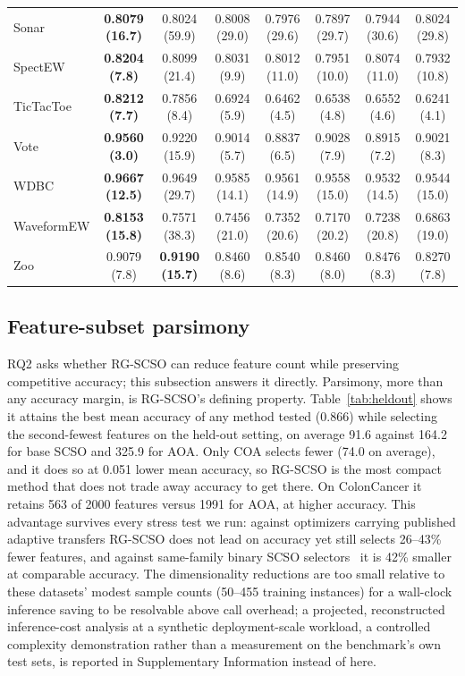 \documentclass[iicol,sn-basic,pdflatex]{sn-jnl}
\begin{document}
\begin{table}[t]
\begin{tabular}{lccccccc}
Sonar & \textbf{0.8079 (16.7)} & 0.8024 (59.9) & 0.8008 (29.0) & 0.7976 (29.6) & 0.7897 (29.7) & 0.7944 (30.6) & 0.8024 (29.8) \\
SpectEW & \textbf{0.8204 (7.8)} & 0.8099 (21.4) & 0.8031 (9.9) & 0.8012 (11.0) & 0.7951 (10.0) & 0.8074 (11.0) & 0.7932 (10.8) \\
TicTacToe & \textbf{0.8212 (7.7)} & 0.7856 (8.4) & 0.6924 (5.9) & 0.6462 (4.5) & 0.6538 (4.8) & 0.6552 (4.6) & 0.6241 (4.1) \\
Vote & \textbf{0.9560 (3.0)} & 0.9220 (15.9) & 0.9014 (5.7) & 0.8837 (6.5) & 0.9028 (7.9) & 0.8915 (7.2) & 0.9021 (8.3) \\
WDBC & \textbf{0.9667 (12.5)} & 0.9649 (29.7) & 0.9585 (14.1) & 0.9561 (14.9) & 0.9558 (15.0) & 0.9532 (14.5) & 0.9544 (15.0) \\
WaveformEW & \textbf{0.8153 (15.8)} & 0.7571 (38.3) & 0.7456 (21.0) & 0.7352 (20.6) & 0.7170 (20.2) & 0.7238 (20.8) & 0.6863 (19.0) \\
Zoo & 0.9079 (7.8) & \textbf{0.9190 (15.7)} & 0.8460 (8.6) & 0.8540 (8.3) & 0.8460 (8.0) & 0.8476 (8.3) & 0.8270 (7.8) \\
\bottomrule
\end{tabular}
\end{table}


\subsection{Feature-subset parsimony}
\label{sec:parsimony}
RQ2 asks whether RG-SCSO can reduce feature count while preserving
competitive accuracy; this subsection answers it directly. Parsimony, more
than any accuracy margin, is RG-SCSO's defining property.
Table~\ref{tab:heldout} shows it attains the best mean accuracy of any
method tested (0.866) while selecting the
second-fewest features on the held-out setting, on average
91.6 against
164.2 for base SCSO and
325.9 for AOA. Only COA selects fewer
(74.0 on average), and it does so at
0.051 lower
mean accuracy, so RG-SCSO is the most compact method that does not trade
away accuracy to get there. On ColonCancer it retains
563 of 2000 features
versus 1991 for AOA, at higher accuracy.
This advantage survives every stress test we run: against optimizers
carrying published adaptive transfers RG-SCSO does not lead on accuracy yet
still selects 26--43\% fewer
features, and against same-family binary SCSO
selectors~\cite{bscso,scsofs2,scsofs3} it is
42\% smaller at comparable accuracy. The dimensionality reductions are too small relative to these datasets' modest sample counts (50--455 training instances) for a wall-clock inference saving to be resolvable above call overhead; a projected, reconstructed inference-cost analysis at a synthetic deployment-scale workload, a controlled complexity demonstration rather than a measurement on the benchmark's own test sets, is reported in Supplementary Information instead of here.
\end{document}

